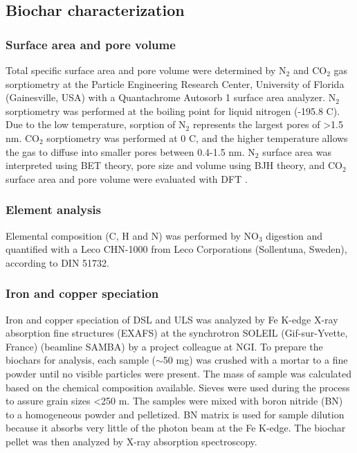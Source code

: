 \subsection{Biochar characterization}

\subsubsection{Surface area and pore volume}
Total specific surface area and pore volume were determined by $\mathrm{N_2}$ and $\mathrm{CO_2}$ gas sorptiometry at the Particle Engineering Research Center, University of Florida (Gainesville, USA) with a Quantachrome Autosorb 1 surface area analyzer.  $\mathrm{N_2}$ sorptiometry was performed at the boiling point for liquid nitrogen (-195.8 \textdegree C). Due to the low temperature, sorption of  $\mathrm{N_2}$ represents the largest pores of \textgreater 1.5 nm. $\mathrm{CO_2}$ sorptiometry was performed at 0 \textdegree C, and the higher temperature allows the gas to diffuse into smaller pores between 0.4-1.5 nm. $\mathrm{N_2}$ surface area was interpreted using BET theory, pore size and volume using BJH theory, and $\mathrm{CO_2}$ surface area and pore volume were evaluated with DFT \citep{kwon2005}. 

\subsubsection{Element analysis}
Elemental composition (C, H and N) was performed by $\mathrm{NO_3}$ digestion and quantified with a Leco CHN-1000 from Leco Corporations (Sollentuna, Sweden), according to DIN 51732.  

\subsubsection{Iron and copper speciation}
Iron and copper speciation of DSL and ULS was analyzed by Fe K-edge X-ray absorption fine structures (EXAFS) at the synchrotron SOLEIL (Gif-sur-Yvette, France) (beamline SAMBA) by a project colleague at NGI. To prepare the biochars for analysis, each sample ($\sim$50 mg) was crushed with a mortar to a fine powder until no visible particles were present. The mass of sample was calculated based on the chemical composition available. Sieves were used during the process to assure grain sizes \textless 250 \textmu m. The samples were mixed with boron nitride (BN) to a homogeneous powder and pelletized. BN matrix is used for sample dilution because it absorbs very little of the photon beam at the Fe K-edge. The biochar pellet was then analyzed by X-ray absorption spectroscopy.  

